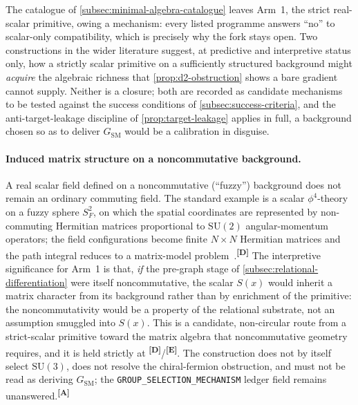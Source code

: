 \documentclass[12pt,a4paper,twoside]{article}
\theoremstyle{plain}
\theoremstyle{definition}
\theoremstyle{remark}
\newcommand{\catmark}[1]{\textsuperscript{\textsf{\textbf{[#1]}}}}
\newcommand{\Sx}{S(x)}
\begin{document}
The catalogue of \cref{subsec:minimal-algebra-catalogue} leaves Arm~1, the strict real-scalar primitive, owing a mechanism: every listed programme answers ``no'' to scalar-only compatibility, which is precisely why the fork stays open. Two constructions in the wider literature suggest, at predictive and interpretive status only, how a strictly scalar primitive on a sufficiently structured background might \emph{acquire} the algebraic richness that \cref{prop:d2-obstruction} shows a bare gradient cannot supply. Neither is a closure; both are recorded as candidate mechanisms to be tested against the success conditions of \cref{subsec:success-criteria}, and the anti-target-leakage discipline of \cref{prop:target-leakage} applies in full, a background chosen so as to deliver $G_{\mathrm{SM}}$ would be a calibration in disguise.

\paragraph{Induced matrix structure on a noncommutative background.}
A real scalar field defined on a noncommutative (``fuzzy'') background does not remain an ordinary commuting field. The standard example is a scalar $\phi^4$-theory on a fuzzy sphere $S_F^2$, on which the spatial coordinates are represented by non-commuting Hermitian matrices proportional to $\mathrm{SU}(2)$ angular-momentum operators; the field configurations become finite $N\times N$ Hermitian matrices and the path integral reduces to a matrix-model problem~\cite{fuzzy1012}.\catmark{D} The interpretive significance for Arm~1 is that, \emph{if} the pre-graph stage of \cref{subsec:relational-differentiation} were itself noncommutative, the scalar $\Sx$ would inherit a matrix character from its background rather than by enrichment of the primitive: the noncommutativity would be a property of the relational substrate, not an assumption smuggled into $\Sx$. This is a candidate, non-circular route from a strict-scalar primitive toward the matrix algebra that noncommutative geometry requires, and it is held strictly at \catmark{D}/\catmark{E}. The construction does not by itself select $\mathrm{SU}(3)$, does not resolve the chiral-fermion obstruction, and must not be read as deriving $G_{\mathrm{SM}}$; the \texttt{GROUP\_SELECTION\_MECHANISM} ledger field remains unanswered.\catmark{A}
\end{document}
